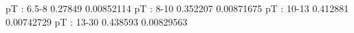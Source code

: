 pT : 6.5-8
0.27849 0.00852114
pT : 8-10
0.352207 0.00871675
pT : 10-13
0.412881 0.00742729
pT : 13-30
0.438593 0.00829563
